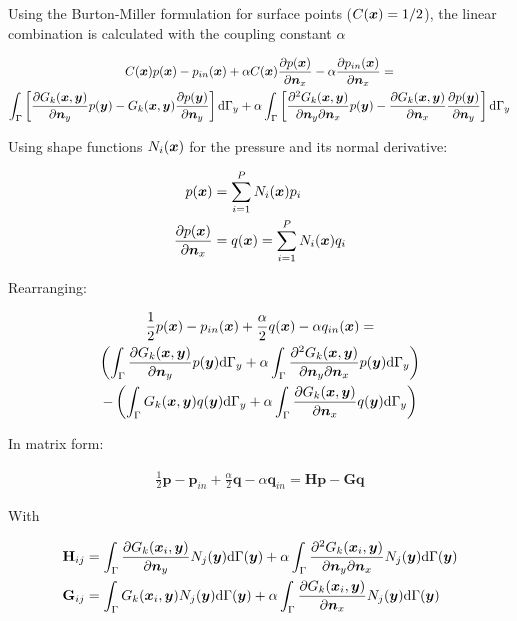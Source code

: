 \documentclass[a4paper, 10pt]{article}
\newcommand{\td}{\mathrm{d}}
\newcommand{\sx}{\bm{\mathnormal{x}}}
\newcommand{\sy}{\bm{\mathnormal{y}}}
\newcommand{\sn}{\bm{\mathnormal{n}}}
\newcommand{\bp}{\mathbf{p}}
\newcommand{\bq}{\mathbf{q}}
\newcommand{\bH}{\mathbf{H}}
\newcommand{\bG}{\mathbf{G}}
\begin{document}
Using the Burton-Miller formulation for surface points ($C(\sx) = 1/2$), the linear combination is calculated with the coupling constant $\alpha$

\begin{multline}
	C(\sx) p (\sx)
	-
	p_{in}(\sx)
	+
	\alpha
	C(\sx) \frac{\partial p(\sx)}{\partial \sn_x}
	-
	\alpha \frac{\partial p_{in}(\sx)}{\partial \sn_x}
	= \\
	\int_{\Gamma}\left[\frac{\partial{G}_k (\sx, \sy)}{\partial \sn_y} p(\sy)
	- G_k(\sx,\sy)\frac{\partial p(\sy)}{\partial \sn_y}\right] \td \Gamma_y
	+
	\alpha \int_{\Gamma}
	\left[
	\frac{\partial^2{G}_k (\sx, \sy)}{\partial \sn_y \partial \sn_x} p(\sy)
	- \frac{\partial G_k(\sx,\sy)}{\partial \sn_x}\frac{\partial p(\sy)}{\partial \sn_y}
	\right] \td \Gamma_y
\end{multline}

Using shape functions $N_i(\sx)$ for the pressure and its normal derivative:

\begin{align}
	p(\sx) & = \sum\limits_{i=1}^P N_i(\sx)p_i \\
	\frac{\partial p(\sx)}{\partial \sn_x} & = q(\sx) = \sum\limits_{i=1}^P N_i(\sx)q_i
\end{align}

Rearranging:

\begin{multline}
	\frac{1}{2} p (\sx)
	-
	p_{in}(\sx)
	+
	\frac{\alpha}{2} q(\sx)
	-
	\alpha q_{in}(\sx)
	= \\
	\left(
	\int_{\Gamma} \frac{\partial{G}_k (\sx, \sy)}{\partial \sn_y} p(\sy) \td \Gamma_y
	+
	\alpha \int_{\Gamma}
	\frac{\partial^2{G}_k (\sx, \sy)}{\partial \sn_y \partial \sn_x} p(\sy) \td \Gamma_y
	\right)
	\\
	-
	\left(
	\int_{\Gamma} G_k(\sx,\sy) q(\sy) \td \Gamma_y
	+
	\alpha \int_{\Gamma}
	\frac{\partial G_k(\sx,\sy)}{\partial \sn_x}q(\sy) \td \Gamma_y
	\right)
\end{multline}

In matrix form:

\begin{align}
	\frac{1}{2} \mathbf{p} - \mathbf{p}_{in} + \frac{\alpha}{2} \mathbf{q} - \alpha \mathbf{q}_{in} = \bH \bp - \bG \bq
\end{align}

With

\begin{align}
	\bH_{ij}
	& = \int_{\Gamma}\frac{\partial{G}_k (\sx_i, \sy)}{\partial \sn_y} N_j(\sy) \td \Gamma(\sy)
	+ \alpha \int_\Gamma \frac{\partial^2{G}_k (\sx_i, \sy)}{\partial \sn_y \partial \sn_x} N_j(\sy) \td \Gamma(\sy) \nonumber \\
	\bG_{ij}
	& = \int_{\Gamma} G_k(\sx_i,\sy) N_j(\sy) \td \Gamma(\sy)
	+ \alpha \int_\Gamma \frac{\partial{G}_k (\sx_i, \sy)}{\partial \sn_x} N_j(\sy) \td \Gamma(\sy)
\end{align}
\end{document}
